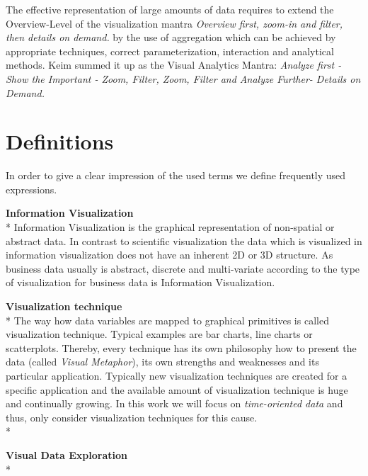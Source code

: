 
The effective representation of large amounts of data requires to extend the Overview-Level of the visualization mantra\cite{Shneiderman2008} \textit{Overview first, zoom-in and filter, then details on demand.} by the use of aggregation which can be achieved by appropriate techniques, correct parameterization, interaction and analytical methods\cite{Aigner2008}. Keim summed it up as the Visual Analytics Mantra\cite{Aigner2011}: \textit{Analyze first - Show the Important - Zoom, Filter, Zoom, Filter and Analyze Further- Details on Demand.} 



\section{Definitions}
In order to give a clear impression of the used terms we define frequently used expressions.

\textbf{Information Visualization}\\*
Information Visualization is the graphical representation of non-spatial or abstract data\cite{Keim}. In contrast to scientific visualization the data which is visualized in information visualization does not have an inherent 2D or 3D structure\cite{Shneiderman2008}. 
As business data usually is abstract, discrete and multi-variate according to \cite{Tegarden1999a} the type of visualization for business data is Information Visualization.

\textbf{Visualization technique}\\*
The way how data variables are mapped to graphical primitives is called visualization technique. Typical examples are bar charts, line charts or scatterplots. Thereby, every technique has its own philosophy how to present the data (called \textit{Visual Metaphor}\cite{Tegarden1999}), its own strengths and weaknesses and its particular application. Typically new visualization techniques are created for a specific application and the available amount of visualization technique is huge and continually growing. In this work we will focus on \textit{time-oriented data} and thus, only consider visualization techniques for this cause. 
\\*

\textbf{Visual Data Exploration}\\*

